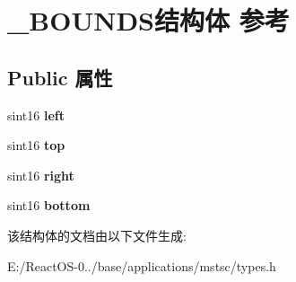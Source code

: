 \hypertarget{struct___b_o_u_n_d_s}{}\section{\+\_\+\+B\+O\+U\+N\+D\+S结构体 参考}
\label{struct___b_o_u_n_d_s}
\subsection*{Public 属性}
\begin{DoxyCompactItemize}
\item 
\mbox{\label{struct___b_o_u_n_d_s_a217265138738e846d8688a78805ffb20}} 
sint16 {\bfseries left}
\item 
\mbox{\label{struct___b_o_u_n_d_s_a3350a26d8737d72a39c19701946c2096}} 
sint16 {\bfseries top}
\item 
\mbox{\label{struct___b_o_u_n_d_s_a97890ab3c19d9044d1885d188c73a3d1}} 
sint16 {\bfseries right}
\item 
\mbox{\label{struct___b_o_u_n_d_s_ad085c2ac1469715c9b880a5c7d3147c8}} 
sint16 {\bfseries bottom}
\end{DoxyCompactItemize}


该结构体的文档由以下文件生成\+:\begin{DoxyCompactItemize}
\item 
E\+:/\+React\+O\+S-\/0../base/applications/mstsc/types.\+h\end{DoxyCompactItemize}
